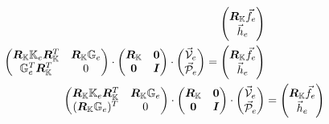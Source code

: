 \begin{align}
\begin{pmatrix}
{\bm R}_{\mathbb{K}} \vec{f}_e \\ \vec{h}_{e}
\end{pmatrix}
\nonumber\\
\begin{pmatrix}
{\bm R}_{\mathbb{K}} {\mathbb{K}}_e {\bm R}_{\mathbb{K}}^T& {\bm R}_{\mathbb{K}} {\mathbb{G}}_e \\
{\mathbb{G}}_e^T {\bm R}_{\mathbb{K}}^T& 0 
\end{pmatrix}
\cdot
\begin{pmatrix}
{\bm R}_{\mathbb{K}} & {\bm 0} \\
{\bm 0} & {\bm I} 
\end{pmatrix}
\cdot
\begin{pmatrix}
\vec{\cal V}_e \\ \vec{\cal P}_e
\end{pmatrix}
=
\begin{pmatrix}
{\bm R}_{\mathbb{K}} \vec{f}_e \\ \vec{h}_{e}
\end{pmatrix}
\nonumber\\
\begin{pmatrix}
{\bm R}_{\mathbb{K}} {\mathbb{K}}_e {\bm R}_{\mathbb{K}}^T& {\bm R}_{\mathbb{K}} {\mathbb{G}}_e \\
({\bm R}_{\mathbb{K}} {\mathbb{G}}_e)^T & 0 
\end{pmatrix}
\cdot
\begin{pmatrix}
{\bm R}_{\mathbb{K}} & {\bm 0} \\
{\bm 0} & {\bm I} 
\end{pmatrix}
\cdot
\begin{pmatrix}
\vec{\cal V}_e \\ \vec{\cal P}_e
\end{pmatrix}
&=
\begin{pmatrix}
{\bm R}_{\mathbb{K}} \vec{f}_e \\ \vec{h}_{e}
\end{pmatrix}
\end{align}

